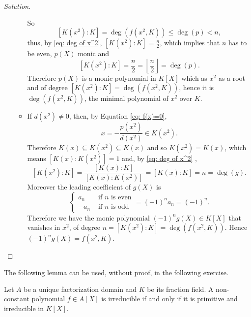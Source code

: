 \documentclass[a4paper,10pt,reqno]{amsart}
\newenvironment{sol}
  {\renewcommand\qedsymbol{$\blacksquare$}\begin{proof}[Solution]}
  {\end{proof}}
\begin{document}
\begin{sol}
\begin{enumerate}[label=(\roman*)]
\begin{itemize}
        So 
        \[
        [K(x^2):K]=\deg(f(x^2,K))\leq \deg(p)< n,
        \]
        thus, by \eqref{eq: deg of x^2}, $[K(x^2):K]=\frac{n}{2}$, which implies that $n$ has to be even, $p(X)$ monic and 
        \[
        [K(x^2):K]=\frac{n}{2}=\left\lfloor \frac{n}{2}\right\rfloor=\deg(p).
        \]
        Therefore $p(X)$ is a monic polynomial in $K[X]$
        which as $x^2$ as a root and of degree $[K(x^2):K]=\deg(f(x^2,K))$,
        hence it is $\deg(f(x^2,K))$,
        the minimal polynomial of $x^2$ over $K$.
        \item If $d(x^2)\neq0$, then, by Equation \eqref{eq: f(x)=0}, 
        \[
        x=-\frac{p(x^2)}{d(x^2)}\in K(x^2).
        \]
        Therefore $K(x)\subseteq K(x^2)\subseteq K(x)$ and so $K(x^2)=K(x)$,
        which means $[K(x):K(x^2)]=1$ and, by \eqref{eq: deg of x^2} ,
        \[
        [K(x^2):K]=\frac{[K(x):K]}{[K(x):K(x^2)]}=[K(x):K]=n=\deg(g).
        \]
        Moreover the leading coefficient of $g(X)$ is
        \[
        \begin{cases}
        a_n &\text{ if }n\text{ is even}\\
        -a_n&\text{ if }n\text{ is odd}
        \end{cases}=(-1)^na_n=(-1)^n .
        \]
        Therefore we have the monic polynomial  
        $(-1)^ng(X)\in K[X]$ that vanishes in $x^2$,
        of degree $n=[K(x^2):K]=\deg(f(x^2,K))$. Hence $(-1)^ng(X)=f(x^2,K)$.\qedhere
    \end{itemize}
    \end{enumerate}
\end{sol}



The following lemma can be used, without proof, in the following exercise.

\begin{lem*}
    Let $A$ be a unique factorization domain and $K$ be its fraction field.
    A non-constant polynomial $f\in A[X]$ is irreducible if and only if it is primitive and irreducible in $K[X]$.
\end{lem*}
\end{document}
